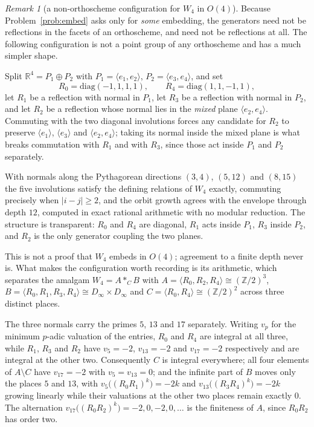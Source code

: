 \documentclass[11pt]{article}
\theoremstyle{definition}
\theoremstyle{remark}
\newtheorem{remark}[theorem]{Remark}
\theoremstyle{definition}
\newcommand{\Z}{\mathbb{Z}}
\newcommand{\R}{\mathbb{R}}
\begin{document}
\begin{remark}[a non-orthoscheme configuration for $W_4$ in $O(4)$]\label{rem:w4direct}
Because Problem~\ref{prob:embed} asks only for \emph{some} embedding, the generators need not be
reflections in the facets of an orthoscheme, and need not be reflections at all. The following
configuration is not a point group of any orthoscheme and has a much simpler shape.

Split $\R^4=P_1\oplus P_2$ with $P_1=\langle e_1,e_2\rangle$, $P_2=\langle e_3,e_4\rangle$, and set
\[
  R_0=\mathrm{diag}(-1,1,1,1),\qquad R_4=\mathrm{diag}(1,1,-1,1),
\]
let $R_1$ be a reflection with normal in $P_1$, let $R_3$ be a reflection with normal in $P_2$,
and let $R_2$ be a reflection whose normal lies in the \emph{mixed} plane
$\langle e_2,e_4\rangle$. Commuting with the two diagonal involutions forces any candidate for
$R_2$ to preserve $\langle e_1\rangle$, $\langle e_3\rangle$ and $\langle e_2,e_4\rangle$; taking
its normal inside the mixed plane is what breaks commutation with $R_1$ and with $R_3$, since
those act inside $P_1$ and $P_2$ separately.

With normals along the Pythagorean directions $(3,4)$, $(5,12)$ and $(8,15)$ the five involutions
satisfy the defining relations of $W_4$ exactly, commuting precisely when $|i-j|\ge2$, and the
orbit growth agrees with the envelope through depth $12$, computed in exact rational arithmetic
with no modular reduction. The structure is transparent: $R_0$ and $R_4$ are diagonal, $R_1$ acts
inside $P_1$, $R_3$ inside $P_2$, and $R_2$ is the only generator coupling the two planes.

This is not a proof that $W_4$ embeds in $O(4)$; agreement to a finite depth never is. What makes
the configuration worth recording is its arithmetic, which separates the amalgam
$W_4=A\ast_CB$ with $A=\langle R_0,R_2,R_4\rangle\cong(\Z/2)^3$,
$B=\langle R_0,R_1,R_3,R_4\rangle\cong D_\infty\times D_\infty$ and
$C=\langle R_0,R_4\rangle\cong(\Z/2)^2$ across three distinct places.

The three normals carry the primes $5$, $13$ and $17$ separately. Writing $v_p$ for the minimum
$p$-adic valuation of the entries, $R_0$ and $R_4$ are integral at all three, while $R_1$, $R_3$
and $R_2$ have $v_5=-2$, $v_{13}=-2$ and $v_{17}=-2$ respectively and are integral at the other
two. Consequently $C$ is integral everywhere; all four elements of $A\setminus C$ have
$v_{17}=-2$ with $v_5=v_{13}=0$; and the infinite part of $B$ moves only the places $5$ and $13$,
with $v_5\bigl((R_0R_1)^k\bigr)=-2k$ and $v_{13}\bigl((R_3R_4)^k\bigr)=-2k$ growing linearly while
their valuations at the other two places remain exactly $0$. The alternation
$v_{17}\bigl((R_0R_2)^k\bigr)=-2,0,-2,0,\dots$ is the finiteness of $A$, since $R_0R_2$ has order
two.


\end{remark}
\end{document}
